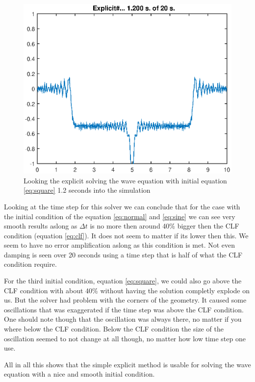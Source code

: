 \documentclass[11pt]{article}
\begin{document}
\begin{figure}[H]
	\centering
	\includegraphics[width=1\textwidth]{../explicitSquare}
	\caption{Looking the explicit solving the wave equation with initial equation 
	\ref{eq:square} 1.2 seconds into the simulation}
	\label{fig:explicitSquare}
\end{figure}
Looking at the time step for this solver we can conclude that for the case with the initial condition of the equation \ref{eq:normal} and \ref{eq:sine} we can see very smooth results aslong as $\Delta t$ is no more then around 40\% bigger then the CLF condition (equation \ref{eq:clf}). It does not seem to matter if its lower then this. We seem to have no error amplification aslong as this condition is met. Not even damping is seen over 20 seconds using a time step that is half of what the CLF condition require.   

For the third initial condition, equation \ref{eq:square}, we could also go above the CLF condition with about 40\% without having the solution completly explode on us. But the solver had problem with the corners of the geometry. It caused some oscillations that was exaggerated if the time step was above the CLF condition. One should note though that the oscillation was always there, no matter if you where below the CLF condition. Below the CLF condition the size of the oscillation seemed to not change at all though, no matter how low time step one use.

All in all this shows that the simple explicit method is usable for solving the wave equation with a nice and smooth initial condition.  
\end{document}
